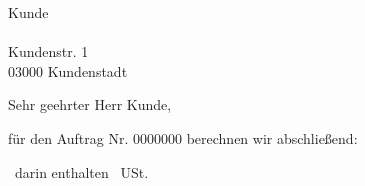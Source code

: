 \documentclass[backaddress=false,11pt]{scrlttr2}
\renewcommand*\LangDecimalSeparator{\kern .333pt ,\kern .333pt}
\begin{document}
	\begin{letter}{Kunde\\ \ \\ Kundenstr. 1\\ 03000  Kundenstadt}

	
		\opening{Sehr geehrter Herr Kunde,}

		für den Auftrag Nr. 0000000 berechnen wir abschließend:

		\vspace{10pt}




		\begin{Rechnung}[N]
		\end{Rechnung}

\noindent
\Gesamtsumme\ darin enthalten \Mehrwertsteuer\ USt.

	\end{letter}
\end{document}

